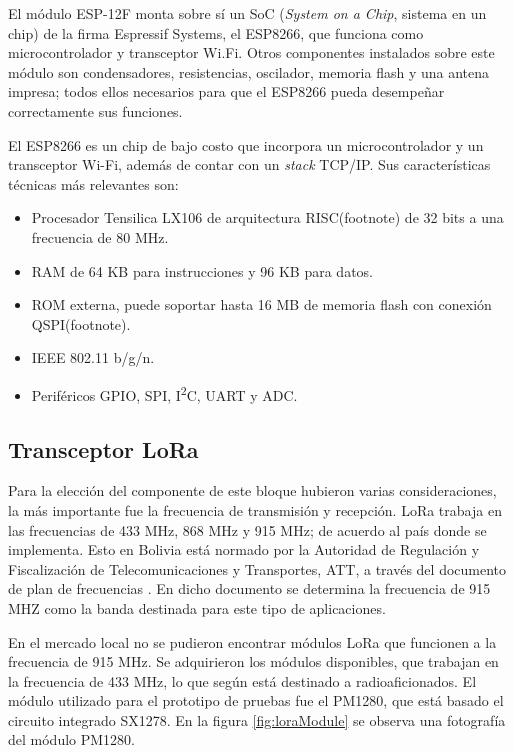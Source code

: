 
El módulo ESP-12F monta sobre sí un SoC (\textit{System on a Chip}, sistema en un chip) de la firma Espressif Systems, el ESP8266, que funciona como microcontrolador y transceptor Wi.Fi. Otros componentes instalados sobre este módulo son condensadores, resistencias, oscilador, memoria flash y una antena impresa; todos ellos necesarios para que el ESP8266 pueda desempeñar correctamente sus funciones.

El ESP8266 es un chip de bajo costo que incorpora un microcontrolador y un transceptor Wi-Fi, además de contar con un \textit{stack} TCP/IP. Sus características técnicas más relevantes son:
\begin{itemize}
	\item Procesador Tensilica LX106 de arquitectura RISC(footnote) de 32 bits a una frecuencia de 80 MHz.
	\item RAM de 64 KB para instrucciones y 96 KB para datos.
	\item ROM externa, puede soportar hasta 16 MB de memoria flash con conexión QSPI(footnote).
	\item IEEE 802.11 b/g/n.
	\item Periféricos GPIO, SPI, I\textsuperscript{2}C, UART y ADC.
\end{itemize}

\subsection{Transceptor LoRa}

Para la elección del componente de este bloque hubieron varias consideraciones, la más importante fue la frecuencia de transmisión y recepción. LoRa trabaja en las frecuencias de 433 MHz, 868 MHz y 915 MHz; de acuerdo al país donde se implementa. Esto en Bolivia está normado por la Autoridad de Regulación y Fiscalización de Telecomunicaciones y Transportes, ATT, a través del documento de plan de frecuencias \citep{WEBSITE:17}. En dicho documento se determina la frecuencia de 915 MHZ como la banda destinada para este tipo de aplicaciones.

En el mercado local no se pudieron encontrar módulos LoRa que funcionen a la frecuencia de 915 MHz. Se adquirieron los módulos disponibles, que trabajan en la frecuencia de 433 MHz, lo que según \citep{WEBSITE:17} está destinado a radioaficionados. El módulo utilizado para el prototipo de pruebas fue el PM1280, que está basado el circuito integrado SX1278. En la figura \ref{fig:loraModule} se observa una fotografía del módulo PM1280.

